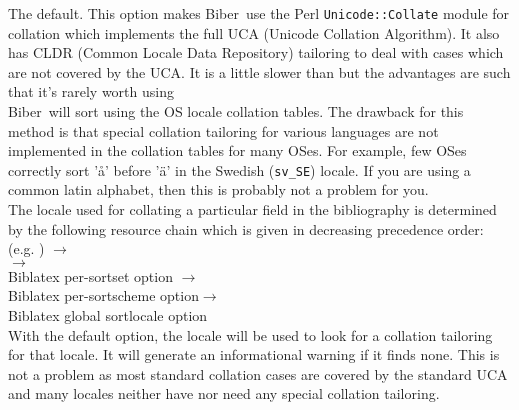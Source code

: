 \documentclass{ltxdockit}
\newcommand*{\biber}{Biber\xspace}
\newcommand*{\biblatex}{Biblatex\xspace}
\def\biberex#1{\hbox{\hspace{-4em}\texttt{\small \detokenize{#1}}}}
\begin{document}
\biberex{--collate|-C}
  \noindent The default. This option makes \biber\ use the Perl
  \verb+Unicode::Collate+ module for collation which implements the full UCA (Unicode
  Collation Algorithm). It also has CLDR (Common Locale Data
  Repository) tailoring to deal with cases which are not covered by the
  UCA. It is a little slower than  but the
  advantages are such that it's rarely worth using \\[1ex]

\biberex{--fastsort|-f}
  \noindent \biber\ will sort using
  the OS locale collation tables. The drawback for this method is that special
  collation tailoring for various languages are not implemented in the
  collation tables for many OSes. For example, few OSes correctly sort 'å'
  before 'ä' in the Swedish (\verb+sv_SE+) locale. If you are using a
  common latin alphabet, then this is probably not a problem for you.\\[2ex]

\noindent The locale used for collating a particular field in the
bibliography is determined by the following resource chain which is given
in decreasing precedence order:\\[2ex]

\noindent{} (e.g. ) $\rightarrow$\\
\hspace*{1em} $\rightarrow$\\
\hspace*{2em}\biblatex per-sortset  option $\rightarrow$\\
\hspace*{3em}\biblatex per-sortscheme  option$\rightarrow$\\
\hspace*{4em}\biblatex global sortlocale option\\

\noindent With the default  option, the locale will be
used to look for a collation tailoring for that locale. It will generate an
informational warning if it finds none. This is not a problem as most
standard collation cases are covered by the standard UCA and many locales
neither have nor need any special collation tailoring.
\end{document}

